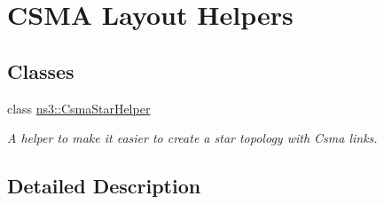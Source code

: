 \hypertarget{group__csmalayout}{}\section{C\+S\+MA Layout Helpers}
\label{group__csmalayout}
\subsection*{Classes}
\begin{DoxyCompactItemize}
\item 
class \hyperlink{classns3_1_1CsmaStarHelper}{ns3\+::\+Csma\+Star\+Helper}
\begin{DoxyCompactList}\small\item\em A helper to make it easier to create a star topology with Csma links. \end{DoxyCompactList}\end{DoxyCompactItemize}


\subsection{Detailed Description}
